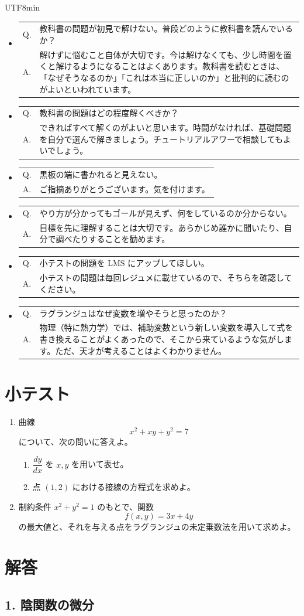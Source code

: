 \documentclass[a4paper,12pt]{article}
\makeatletter
\newcommand{\feedbackqa}[2]{%
\item[]
\begin{tabular}[t]{@{}p{1.8em}@{\hspace{0.4em}}p{\dimexpr\linewidth-2.2em\relax}@{}}
Q. & #1 \\
A. & #2
\end{tabular}
\par\smallskip\hrulefill
}
\makeatother
\begin{document}
\begin{CJK}{UTF8}{min}
\begin{itemize}[leftmargin=1.5em,itemsep=0.7em,topsep=0.3em]
\feedbackqa{教科書の問題が初見で解けない。普段どのように教科書を読んでいるか？}{解けずに悩むこと自体が大切です。今は解けなくても、少し時間を置くと解けるようになることはよくあります。教科書を読むときは、「なぜそうなるのか」「これは本当に正しいのか」と批判的に読むのがよいといわれています。}
\feedbackqa{教科書の問題はどの程度解くべきか？}{できればすべて解くのがよいと思います。時間がなければ、基礎問題を自分で選んで解きましょう。チュートリアルアワーで相談してもよいでしょう。}
\feedbackqa{黒板の端に書かれると見えない。}{ご指摘ありがとうございます。気を付けます。}
\feedbackqa{やり方が分かってもゴールが見えず、何をしているのか分からない。}{目標を先に理解することは大切です。あらかじめ誰かに聞いたり、自分で調べたりすることを勧めます。}
\feedbackqa{小テストの問題を LMS にアップしてほしい。}{小テストの問題は毎回レジュメに載せているので、そちらを確認してください。}
\feedbackqa{ラグランジュはなぜ変数を増やそうと思ったのか？}{物理（特に熱力学）では、補助変数という新しい変数を導入して式を書き換えることがよくあったので、そこから来ているような気がします。ただ、天才が考えることはよくわかりません。}
\end{itemize}

\section*{小テスト}

\begin{enumerate}
\item 曲線
\[
x^2+xy+y^2=7
\]
について、次の問いに答えよ。
\begin{enumerate}[label=(\alph*)]
\item $\dfrac{dy}{dx}$ を $x,y$ を用いて表せ。
\item 点 $(1,2)$ における接線の方程式を求めよ。
\end{enumerate}

\item 制約条件 $x^2+y^2=1$ のもとで、関数
\[
f(x,y)=3x+4y
\]
の最大値と、それを与える点をラグランジュの未定乗数法を用いて求めよ。
\end{enumerate}

\section*{解答}

\subsection*{1. 陰関数の微分}


\end{CJK}
\end{document}
